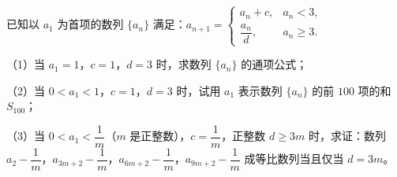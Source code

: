 \begin{question}
已知以 $a_1$ 为首项的数列 $\{a_n\}$ 满足：$a_{n+1}=\begin{cases}a_n+c,&a_n<3,\\ \dfrac{a_n}d,&a_n\geqslant3.\end{cases}$

（1）当 $a_1=1$，$c=1$，$d=3$ 时，求数列 $\{a_n\}$ 的通项公式；

（2）当 $0<a_1<1$，$c=1$，$d=3$ 时，试用 $a_1$ 表示数列 $\{a_n\}$ 的前 $100$ 项的和 $S_{100}$；

（3）当 $0<a_1<\dfrac1m$（$m$ 是正整数），$c=\dfrac1m$，正整数 $d\geqslant3m$ 时，求证：数列 $a_2-\dfrac1m$，$a_{3m+2}-\dfrac1m$，$a_{6m+2}-\dfrac1m$，$a_{9m+2}-\dfrac1m$ 成等比数列当且仅当 $d=3m$。

\end{question}